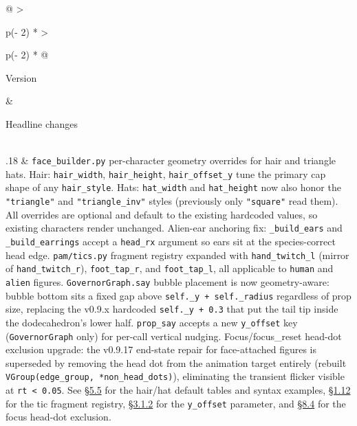 \documentclass[
  11pt,
]{book}
\begin{document}
\begin{longtable}[]{@{}
  >{\raggedright\arraybackslash}p{(\columnwidth - 2\tabcolsep) * }
  >{\raggedright\arraybackslash}p{(\columnwidth - 2\tabcolsep) * }@{}}
\toprule\noalign{}
\begin{minipage}[b]{\linewidth}\raggedright
Version
\end{minipage} & \begin{minipage}[b]{\linewidth}\raggedright
Headline changes
\end{minipage} \\
\midrule\noalign{}
\endhead
\bottomrule\noalign{}
.18 & \texttt{face\_builder.py} per-character geometry overrides for
hair and triangle hats. Hair: \texttt{hair\_width}, \texttt{hair\_height},
\texttt{hair\_offset\_y} tune the primary cap shape of any
\texttt{hair\_style}. Hats: \texttt{hat\_width} and \texttt{hat\_height}
now also honor the \texttt{"triangle"} and \texttt{"triangle\_inv"}
styles (previously only \texttt{"square"} read them). All overrides are
optional and default to the existing hardcoded values, so existing
characters render unchanged. Alien-ear anchoring fix: \texttt{\_build\_ears}
and \texttt{\_build\_earrings} accept a \texttt{head\_rx} argument so
ears sit at the species-correct head edge. \texttt{pam/tics.py}
fragment registry expanded with \texttt{hand\_twitch\_l} (mirror of
\texttt{hand\_twitch\_r}), \texttt{foot\_tap\_r}, and
\texttt{foot\_tap\_l}, all applicable to \texttt{human} and
\texttt{alien} figures.
\texttt{GovernorGraph.say} bubble placement is now geometry-aware:
bubble bottom sits a fixed gap above
\texttt{self.\_y\ +\ self.\_radius} regardless of prop size, replacing
the v0.9.x hardcoded \texttt{self.\_y\ +\ 0.3} that put the tail tip
inside the dodecahedron's lower half. \texttt{prop\_say} accepts a new
\texttt{y\_offset} key (\texttt{GovernorGraph} only) for per-call
vertical nudging.
Focus/focus\_reset head-dot exclusion upgrade: the v0.9.17 end-state
repair for face-attached figures is superseded by removing the head
dot from the animation target entirely (rebuilt
\texttt{VGroup(edge\_group,\ *non\_head\_dots)}), eliminating the
transient flicker visible at \texttt{rt < 0.05}.
See \hyperref[hat-geometry-reference]{§5.5} for the hair/hat default
tables and syntax examples, \hyperref[tic_profile]{§1.12} for the
tic fragment registry, \hyperref[prop_say]{§3.1.2} for the
\texttt{y\_offset} parameter, and
\hyperref[the-focus_reset-overlay-gotcha]{§8.4} for the focus
head-dot exclusion. \\

\end{longtable}
\end{document}
